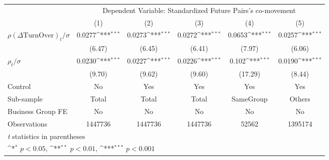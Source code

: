 {
\def\sym#1{\ifmmode^{#1}\else\(^{#1}\)\fi}
\begin{tabular}{l*{5}{c}}
\hline\hline
                &\multicolumn{5}{c}{Dependent Variable: Standardized Future Pairs's co-movement}               \\\cmidrule(lr){2-6}
                &\multicolumn{1}{c}{(1)}         &\multicolumn{1}{c}{(2)}         &\multicolumn{1}{c}{(3)}         &\multicolumn{1}{c}{(4)}         &\multicolumn{1}{c}{(5)}         \\
\hline
 $ {\rho(\Delta \text{TurnOver})_t} / \sigma $ &   0.0277\sym{***}&   0.0273\sym{***}&   0.0272\sym{***}&   0.0653\sym{***}&   0.0257\sym{***}\\
                &   (6.47)         &   (6.45)         &   (6.41)         &   (7.97)         &   (6.06)         \\
[1em]
 $ {\rho_t} / \sigma $ &   0.0230\sym{***}&   0.0227\sym{***}&   0.0226\sym{***}&    0.102\sym{***}&   0.0190\sym{***}\\
                &   (9.70)         &   (9.62)         &   (9.60)         &  (17.29)         &   (8.44)         \\
\hline
Control         &       No         &      Yes         &      Yes         &      Yes         &      Yes         \\
Sub-sample      &    Total         &    Total         &    Total         &SameGroup         &   Others         \\
Business Group FE&       No         &       No         &       No         &       No         &       No         \\
Observations    &  1447736         &  1447736         &  1447736         &    52562         &  1395174         \\
\hline\hline
\multicolumn{6}{l}{\footnotesize \textit{t} statistics in parentheses}\\
\multicolumn{6}{l}{\footnotesize \sym{*} \(p<0.05\), \sym{**} \(p<0.01\), \sym{***} \(p<0.001\)}\\
\end{tabular}
}
